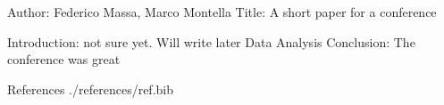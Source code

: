 
Author: Federico Massa, Marco Montella
Title: A short paper for a conference

Introduction: not sure yet. Will write later
Data
Analysis
Conclusion: The conference was great

References
./references/ref.bib
